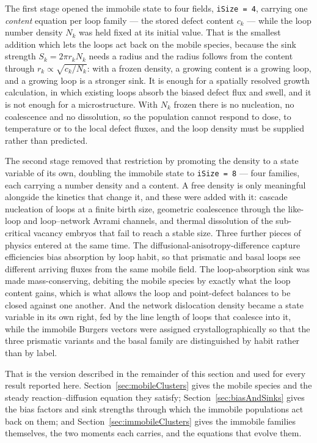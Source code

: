 \documentclass{article}
\begin{document}
The first stage opened the immobile state to four fields, \texttt{iSize = 4},
carrying one \emph{content} equation per loop family --- the stored defect content
$c_k$ --- while the loop number density $N_k$ was held fixed at its initial value.
That is the smallest addition which lets the loops act back on the mobile species,
because the sink strength $S_k=2\pi r_kN_k$ needs a radius and the radius follows
from the content through $r_k\propto\sqrt{c_k/N_k}$: with a frozen density, a
growing content is a growing loop, and a growing loop is a stronger sink. It is
enough for a spatially resolved growth calculation, in which existing loops absorb
the biased defect flux and swell, and it is not enough for a microstructure. With
$N_k$ frozen there is no nucleation, no coalescence and no dissolution, so the
population cannot respond to dose, to temperature or to the local defect fluxes,
and the loop density must be supplied rather than predicted.

The second stage removed that restriction by promoting the density to a state
variable of its own, doubling the immobile state to \texttt{iSize = 8} --- four
families, each carrying a number density and a content. A free density is only
meaningful alongside the kinetics that change it, and these were added with it:
cascade nucleation of loops at a finite birth size, geometric coalescence through
the like-loop and loop--network Avrami channels, and thermal dissolution of the
sub-critical vacancy embryos that fail to reach a stable size. Three further pieces
of physics entered at the same time. The diffusional-anisotropy-difference capture
efficiencies bias absorption by loop habit, so that prismatic and basal loops see
different arriving fluxes from the same mobile field. The loop-absorption sink was
made mass-conserving, debiting the mobile species by exactly what the loop content
gains, which is what allows the loop and point-defect balances to be closed against
one another. And the network dislocation density became a state variable in its
own right, fed by the line length of loops that coalesce into it, while the
immobile Burgers vectors were assigned crystallographically so that the three
prismatic variants and the basal family are distinguished by habit rather than by
label.

That is the version described in the remainder of this section and used for every
result reported here. Section~\ref{sec:mobileClusters} gives the mobile species and
the steady reaction--diffusion equation they satisfy; Section~\ref{sec:biasAndSinks}
gives the bias factors and sink strengths through which the immobile populations
act back on them; and Section~\ref{sec:immobileClusters} gives the immobile
families themselves, the two moments each carries, and the equations that evolve
them.
\end{document}
